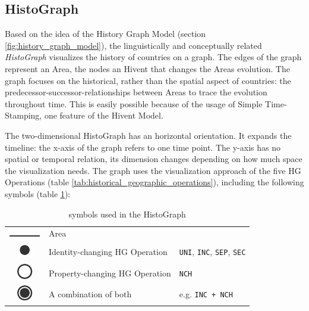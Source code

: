 \subsection{HistoGraph} %
\label{sub:histograph}

Based on the idea of the History Graph Model (section \ref{fig:history_graph_model}), the linguistically and conceptually related \emph{HistoGraph} visualizes the history of countries on a graph. The edges of the graph represent an Area, the nodes an Hivent that changes the Areas evolution. The graph focuses on the historical, rather than the spatial aspect of countries: the predecessor-successor-relationships between Areas to trace the evolution throughout time. This is easily possible because of the usage of Simple Time-Stamping, one feature of the Hivent Model.

The two-dimensional HistoGraph has an horizontal orientation. It expands the timeline: the x-axis of the graph refers to one time point. The y-axis has no spatial or temporal relation, its dimension changes depending on how much space the visualization needs. The graph uses the visualization approach of the five HG Operations (table \ref{tab:historical_geographic_operations}), including the following symbols (table \ref{tab:histograph_symbols}):

\begin{table}[H]
\begin{center}
\begin{tabular}{c l l}

  \raisebox{3.5\height}
  {\includegraphics{graphics/development/histograph/line}}
  & Area
  & \\

  \raisebox{-0.2\height}
  {\includegraphics{graphics/development/histograph/circle_filled}}
  & Identity-changing HG Operation
  & \texttt{UNI}, \texttt{INC}, \texttt{SEP}, \texttt{SEC} \\

  \raisebox{-0.2\height}
  {\includegraphics{graphics/development/histograph/circle_unfilled}}
  & Property-changing HG Operation
  & \texttt{NCH} \\

  \raisebox{-0.2\height}
  {\includegraphics{graphics/development/histograph/circle_combo}}
  & A combination of both
  & e.g. \texttt{INC + NCH} \\

\end{tabular}
\caption{symbols used in the HistoGraph}
\label{tab:histograph_symbols}
\end{center}
\end{table}

